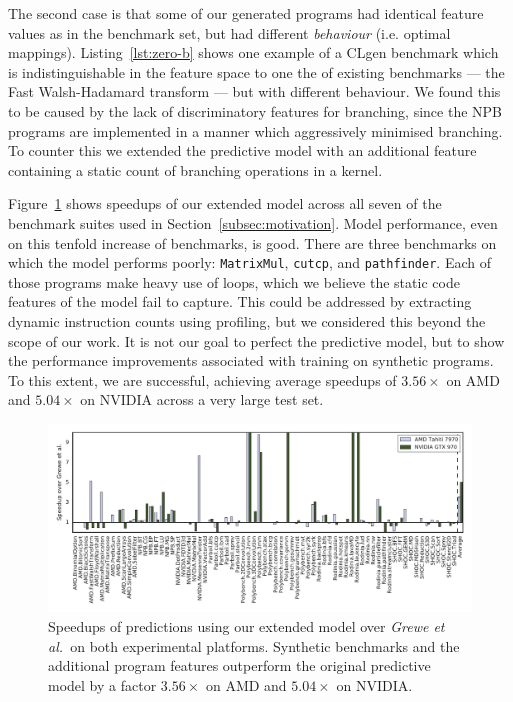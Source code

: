 The second case is that some of our generated programs had identical feature values as in the benchmark set, but had different \emph{behaviour} (i.e. optimal mappings). Listing~\ref{lst:zero-b} shows one example of a CLgen benchmark which is indistinguishable in the feature space to one the of existing benchmarks --- the Fast Walsh-Hadamard transform --- but with different behaviour. We found this to be caused by the lack of discriminatory features for branching, since the NPB programs are implemented in a manner which aggressively minimised branching. To counter this we extended the predictive model with an additional feature containing a static count of branching operations in a kernel.

Figure~\ref{fig:ex2} shows speedups of our extended model across all seven of the benchmark suites used in Section~\ref{subsec:motivation}. Model performance, even on this tenfold increase of benchmarks, is good. There are three benchmarks on which the model performs poorly: \texttt{MatrixMul}, \texttt{cutcp}, and \texttt{pathfinder}. Each of those programs make heavy use of loops, which we believe the static code features of the model fail to capture. This could be addressed by extracting dynamic instruction counts using profiling, but we considered this beyond the scope of our work. It is not our goal to perfect the predictive model, but to show the performance improvements associated with training on synthetic programs. To this extent, we are successful, achieving average speedups of $3.56\times$ on AMD and $5.04\times$ on NVIDIA across a very large test set.

\begin{figure}
  \centering%
  \includegraphics[width=1\textwidth]{img/ex2}%
  \caption[Speedups of predictions using extended model over \emph{Grewe et al.}]{%
    Speedups of predictions using our extended model over \emph{Grewe et al.\ }on both experimental platforms. Synthetic benchmarks and the additional program features outperform the original predictive model by a factor $3.56\times$ on AMD and $5.04\times$ on NVIDIA.%
  }%
  \label{fig:ex2}%
\end{figure}

